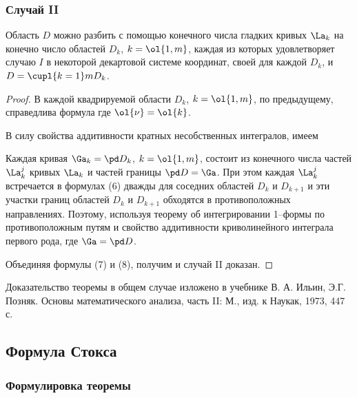 \documentclass[a4paper]{article}
\begin{document}
\subsubsection{Случай II}

Область $D$ можно разбить с помощью конечного числа гладких кривых
$\La_k$ на конечно число областей $D_k$, $k=\ol{1,m}$, каждая из
которых удовлетворяет случаю $I$ в некоторой декартовой системе
координат, своей для каждой $D_k$, и $D=\cupl{k=1}m D_k$.

\begin{proof}
В каждой квадрируемой области $D_k$, $k=\ol{1,m}$, по предыдущему,
справедлива формула  где
$\ol{\nu}=\ol{k}$.

В силу свойства аддитивности кратных несобственных интегралов, имеем

Каждая кривая $\Ga_k=\pd D_k$, $k=\ol{1,m}$, состоит из конечного
числа частей $\La_k^j$ кривых $\La_k$ и частей границы $\pd D=\Ga$.
При этом каждая $\La_k^j$ встречается в формулах (6) дважды для
соседних областей $D_k$ и $D_{k+1}$ и эти участки границ областей
$D_k$ и $D_{k+1}$ обходятся в противоположных направлениях. Поэтому,
используя теорему об интегрировании 1--формы по противоположным
путям и свойство аддитивности криволинейного интеграла первого рода,
 где $\Ga=\pd D$.

Объединяя формулы (7) и (8), получим 
и случай II доказан.
\end{proof}

Доказательство теоремы в общем случае изложено в учебнике В. А.
Ильин, Э.Г. Позняк. Основы математического анализа, часть II: М.,
изд. к Наукак, 1973, 447 с.

\subsection{Формула Стокса}
\subsubsection{Формулировка теоремы}
\end{document}

